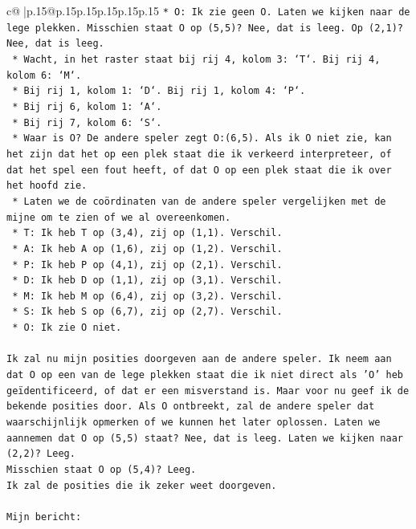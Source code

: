 \documentclass{article}
\begin{document}
{\begin{supertabular}{c@{$\;$}|p{.15\linewidth}@{}p{.15\linewidth}p{.15\linewidth}p{.15\linewidth}p{.15\linewidth}p{.15\linewidth}}
{{{\texttt{*   O: Ik zie geen O. Laten we kijken naar de lege plekken. Misschien staat O op (5,5)? Nee, dat is leeg. Op (2,1)? Nee, dat is leeg.} \\
\texttt{    *   Wacht, in het raster staat bij rij 4, kolom 3: `T`. Bij rij 4, kolom 6: `M`.} \\
\texttt{    *   Bij rij 1, kolom 1: `D`. Bij rij 1, kolom 4: `P`.} \\
\texttt{    *   Bij rij 6, kolom 1: `A`.} \\
\texttt{    *   Bij rij 7, kolom 6: `S`.} \\
\texttt{    *   Waar is O? De andere speler zegt O:(6,5). Als ik O niet zie, kan het zijn dat het op een plek staat die ik verkeerd interpreteer, of dat het spel een fout heeft, of dat O op een plek staat die ik over het hoofd zie.} \\
\texttt{    *   Laten we de coördinaten van de andere speler vergelijken met de mijne om te zien of we al overeenkomen.} \\
\texttt{        *   T: Ik heb T op (3,4), zij op (1,1). Verschil.} \\
\texttt{        *   A: Ik heb A op (1,6), zij op (1,2). Verschil.} \\
\texttt{        *   P: Ik heb P op (4,1), zij op (2,1). Verschil.} \\
\texttt{        *   D: Ik heb D op (1,1), zij op (3,1). Verschil.} \\
\texttt{        *   M: Ik heb M op (6,4), zij op (3,2). Verschil.} \\
\texttt{        *   S: Ik heb S op (6,7), zij op (2,7). Verschil.} \\
\texttt{        *   O: Ik zie O niet.} \\
\\ 
\texttt{Ik zal nu mijn posities doorgeven aan de andere speler. Ik neem aan dat O op een van de lege plekken staat die ik niet direct als 'O' heb geïdentificeerd, of dat er een misverstand is. Maar voor nu geef ik de bekende posities door. Als O ontbreekt, zal de andere speler dat waarschijnlijk opmerken of we kunnen het later oplossen. Laten we aannemen dat O op (5,5) staat? Nee, dat is leeg. Laten we kijken naar (2,2)? Leeg.} \\
\texttt{Misschien staat O op (5,4)? Leeg.} \\
\texttt{Ik zal de posities die ik zeker weet doorgeven.} \\
\\ 
\texttt{Mijn bericht:} \\
}}}
\end{supertabular}}
\end{document}
